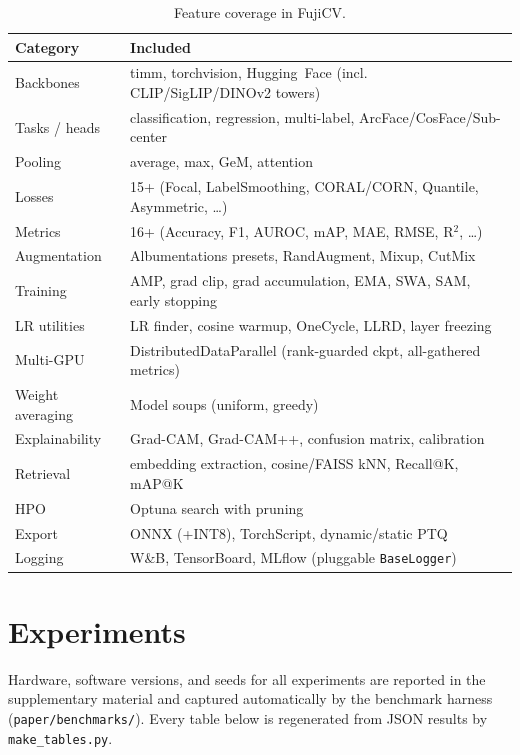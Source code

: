 \documentclass[11pt]{article}
\begin{document}
\begin{table}[t]
\centering
\caption{Feature coverage in FujiCV.}
\label{tab:features}
\small
\begin{tabular}{ll}
\toprule
Category & Included \\
\midrule
Backbones        & timm, torchvision, Hugging~Face (incl. CLIP/SigLIP/DINOv2 towers) \\
Tasks / heads    & classification, regression, multi-label, ArcFace/CosFace/Sub-center \\
Pooling          & average, max, GeM, attention \\
Losses           & 15+ (Focal, LabelSmoothing, CORAL/CORN, Quantile, Asymmetric, \ldots) \\
Metrics          & 16+ (Accuracy, F1, AUROC, mAP, MAE, RMSE, R$^2$, \ldots) \\
Augmentation     & Albumentations presets, RandAugment, Mixup, CutMix \\
Training         & AMP, grad clip, grad accumulation, EMA, SWA, SAM, early stopping \\
LR utilities     & LR finder, cosine warmup, OneCycle, LLRD, layer freezing \\
Multi-GPU        & DistributedDataParallel (rank-guarded ckpt, all-gathered metrics) \\
Weight averaging & Model soups (uniform, greedy) \\
Explainability   & Grad-CAM, Grad-CAM++, confusion matrix, calibration \\
Retrieval        & embedding extraction, cosine/FAISS kNN, Recall@K, mAP@K \\
HPO              & Optuna search with pruning \\
Export           & ONNX (+INT8), TorchScript, dynamic/static PTQ \\
Logging          & W\&B, TensorBoard, MLflow (pluggable \texttt{BaseLogger}) \\
\bottomrule
\end{tabular}
\end{table}

\section{Experiments}
\label{sec:experiments}
Hardware, software versions, and seeds for all experiments are reported in the
supplementary material and captured automatically by the benchmark harness
(\texttt{paper/benchmarks/}). Every table below is regenerated from JSON results
by \texttt{make\_tables.py}.
\end{document}
